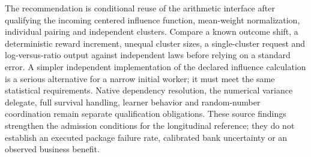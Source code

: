 The recommendation is conditional reuse of the arithmetic interface after
qualifying the incoming centered influence function, mean-weight normalization,
individual pairing and independent clusters. Compare a known outcome shift,
a deterministic reward increment, unequal cluster sizes, a single-cluster
request and log-versus-ratio output against independent laws before relying
on a standard error. A simpler independent implementation of the declared
influence calculation is a serious alternative for a narrow initial worker;
it must meet the same statistical requirements. Native dependency resolution,
the numerical variance delegate, full survival handling, learner behavior and
random-number coordination remain separate qualification obligations. These
source findings strengthen the admission conditions for the longitudinal
reference; they do not establish an executed package failure rate, calibrated
bank uncertainty or an observed business benefit.
\citep{rel23ife,rel23ifecaller,rel23ifewitness}

